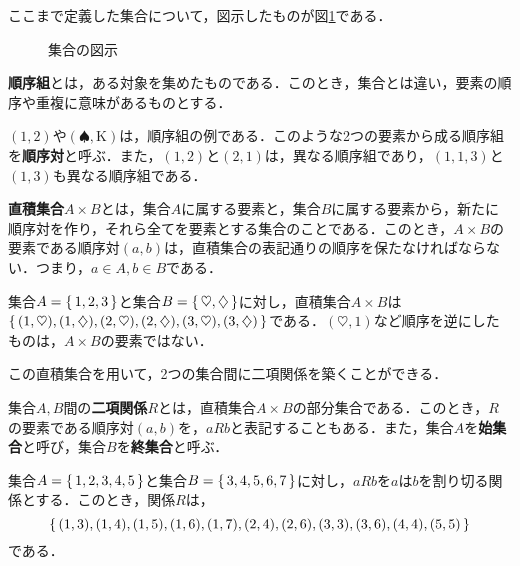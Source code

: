 ここまで定義した集合について，図示したものが図\ref{fig:VennDiagram}である．

\vfill
\begin{figure}[!h]
	\caption{集合の図示}
	\label{fig:VennDiagram}
\end{figure}
\clearpage

\begin{definition}[順序組] %
	\textbf{順序組}とは，ある対象を集めたものである．このとき，集合とは違い，要素の順序や重複に意味があるものとする．
\end{definition}
\begin{example*}
	$(1, 2)$や$(\spadesuit, \text{K})$は，順序組の例である．このような2つの要素から成る順序組を\textbf{順序対}と呼ぶ．また，$(1, 2)$と$(2, 1)$は，異なる順序組であり，$(1, 1, 3)$と$(1, 3)$も異なる順序組である．
\end{example*}
\begin{definition}[直積集合] %
	\textbf{直積集合}$A \times B$とは，集合$A$に属する要素と，集合$B$に属する要素から，新たに順序対を作り，それら全てを要素とする集合のことである．このとき，$A \times B$の要素である順序対$(a, b)$は，直積集合の表記通りの順序を保たなければならない．つまり，$a \in A, b \in B$である．
\end{definition}
\begin{example*}
	集合$A=\left\{\,1,2,3\,\right\}$と集合$B=\left\{\,\heartsuit,\diamondsuit\,\right\}$に対し，直積集合$A \times B$は$\left\{\,(1, \heartsuit),(1,\diamondsuit),(2, \heartsuit),(2,\diamondsuit),(3, \heartsuit),(3,\diamondsuit)\,\right\}$である．$(\heartsuit, 1)$など順序を逆にしたものは，$A \times B$の要素ではない．
\end{example*}

この直積集合を用いて，2つの集合間に二項関係を築くことができる．
\begin{definition}[二項関係] %
	集合$A, B$間の\textbf{二項関係}$R$とは，直積集合$A \times B$の部分集合である．このとき，$R$の要素である順序対$(a,b)$を，$aRb$と表記することもある．また，集合$A$を\textbf{始集合}と呼び，集合$B$を\textbf{終集合}と呼ぶ．
\end{definition}
\begin{example*}
	集合$A=\left\{\,1,2,3,4,5\,\right\}$と集合$B=\left\{\,3,4,5,6,7\,\right\}$に対し，$aRb$を$a$は$b$を割り切る関係とする．このとき，関係$R$は，
	\[
		\left\{\,(1,3),(1,4),(1,5),(1,6),(1,7),(2,4),(2,6),(3,3),(3,6),(4,4),(5,5)\,\right\}
	\]
	である．
\end{example*}

